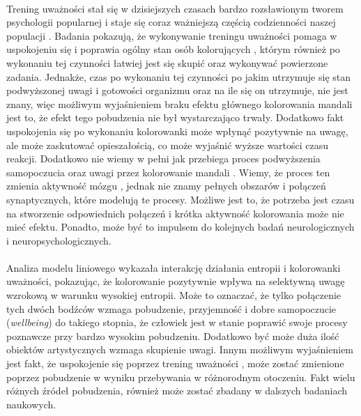 \documentclass[12pt,a4paper,final,oneside,onecolumn,titlepage]{article}
\begin{document}
\paragraph{}
Trening uważności stał się w dzisiejszych czasach bardzo rozsławionym tworem psychologii popularnej i staje się coraz ważniejszą częścią codzienności naszej populacji \citep{dresler_doing_2019}. Badania pokazują, że wykonywanie treningu uważności pomaga w uspokojeniu się i poprawia ogólny stan osób kolorujących \citep{carsley_effectiveness_2018, campenni_effects_2020}, którym również po wykonaniu tej czynności łatwiej jest się skupić oraz wykonywać powierzone zadania. Jednakże, czas po wykonaniu tej czynności po jakim utrzymuje się stan podwyższonej uwagi i gotowości organizmu oraz na ile się on utrzymuje, nie jest znany, więc możliwym wyjaśnieniem braku efektu głównego kolorowania mandali jest to, że efekt tego pobudzenia nie był wystarczająco trwały. Dodatkowo fakt uspokojenia się po wykonaniu kolorowanki \citep{campenni_effects_2020} może wpłynąć pozytywnie na uwagę, ale może zaskutować opieszałością, co może wyjaśnić wyższe wartości czasu reakcji. Dodatkowo nie wiemy w pełni jak przebiega proces podwyższenia samopoczucia oraz uwagi przez kolorowanie mandali \citep{holzel_how_2011}. Wiemy, że proces ten zmienia aktywność mózgu \citep{gotink_8-week_2016}, jednak nie znamy pełnych obszarów i połączeń synaptycznych, które modelują te procesy. Możliwe jest to, że potrzeba jest czasu na stworzenie odpowiednich połączeń i krótka aktywność kolorowania może nie mieć efektu. Ponadto, może być to impulsem do kolejnych badań neurologicznych i neuropsychologicznych.
\paragraph{}
Analiza modelu liniowego wykazała interakcję działania entropii i kolorowanki uważności, pokazując, że kolorowanie pozytywnie wpływa na selektywną uwagę wzrokową w warunku wysokiej entropii. Może to oznaczać, że tylko połączenie tych dwóch bodźców wzmaga pobudzenie, przyjemność i dobre samopoczucie (\textit{wellbeing}) do takiego stopnia, że człowiek jest w stanie poprawić swoje procesy poznawcze przy bardzo wysokim pobudzeniu. Dodatkowo być może duża ilość obiektów artystycznych wzmaga skupienie uwagi. Innym możliwym wyjaśnieniem jest fakt, że uspokojenie się poprzez trening uważności \citep{campenni_effects_2020}, może zostać zmienione poprzez pobudzenie w wyniku przebywania w różnorodnym otoczeniu. Fakt wielu różnych źródeł pobudzenia, również może zostać zbadany w dalszych badaniach naukowych.
\end{document}
